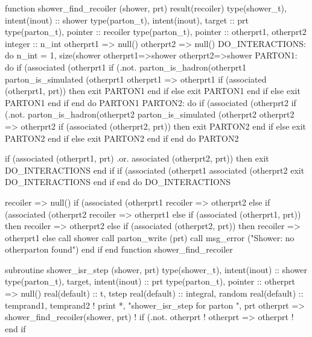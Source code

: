 \eatline
\nwendcode{}\nwdocspar
\nwenddocs{}\plusendmoddef
  function shower_find_recoiler (shower, prt) result(recoiler)
    type(shower_t), intent(inout) :: shower
    type(parton_t), intent(inout), target :: prt
    type(parton_t), pointer :: recoiler
    type(parton_t), pointer :: otherprt1, otherprt2
    integer :: n_int
    otherprt1 => null()
    otherprt2 => null()
    DO_INTERACTIONS: do n_int = 1, size(shower%
       otherprt1=>shower%
       otherprt2=>shower%
       PARTON1: do
          if (associated (otherprt1%
             if (.not. parton_is_hadron(otherprt1%
                  parton_is_simulated (otherprt1%
                otherprt1 => otherprt1%
                if (associated (otherprt1, prt)) then
                   exit PARTON1
                end if
             else
                exit PARTON1
             end if
          else
             exit PARTON1
          end if
       end do PARTON1
       PARTON2: do
          if (associated (otherprt2%
             if (.not. parton_is_hadron(otherprt2%
                  parton_is_simulated (otherprt2%
                otherprt2 => otherprt2%
                if (associated (otherprt2, prt)) then
                   exit PARTON2
                end if
             else
                exit PARTON2
             end if
          else
             exit PARTON2
          end if
       end do PARTON2

       if (associated (otherprt1, prt) .or. associated (otherprt2, prt)) then
          exit DO_INTERACTIONS
       end if
       if (associated (otherprt1%
            associated (otherprt2%
          exit DO_INTERACTIONS
       end if
    end do DO_INTERACTIONS

    recoiler => null()
    if (associated (otherprt1%
       recoiler => otherprt2
    else if (associated (otherprt2%
       recoiler => otherprt1
    else if (associated (otherprt1, prt)) then
       recoiler => otherprt2
    else if (associated (otherprt2, prt)) then
       recoiler => otherprt1
    else
       call shower%
       call parton_write (prt)
       call msg_error ("Shower: no otherparton found")
    end if
  end function shower_find_recoiler

\eatline
\nwendcode{}\nwdocspar
\nwenddocs{}\plusendmoddef
  subroutine shower_isr_step (shower, prt)
    type(shower_t), intent(inout) :: shower
    type(parton_t), target, intent(inout) :: prt
    type(parton_t), pointer :: otherprt => null()
    real(default) :: t, tstep
    real(default) :: integral, random
    real(default) :: temprand1, temprand2
    ! print *, "shower_isr_step for parton ", prt%
    otherprt => shower_find_recoiler(shower, prt)
    ! if (.not. otherprt%
    !    otherprt => otherprt%
    ! end if


